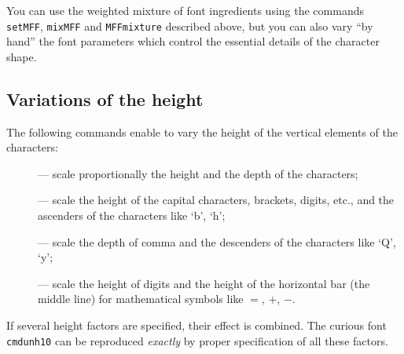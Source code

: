 You can use the weighted mixture of font ingredients using the commands
{\tt\bs{}setMFF}, {\tt\bs{}mixMFF} and {\tt\bs{}MFFmixture} described
above, but you can also vary ``by hand'' the font parameters
which control the essential details of the character shape.

\subsection{Variations of the height\label{HEIGHT}}

The following commands enable to vary the height of the vertical
elements of the characters:
\begin{description}
\item[] --- scale proportionally
     the height and the depth of the characters;
\item[] --- scale
     the height of the capital characters, brackets, digits, etc.,
     and the ascenders of the characters like `b', `h';
\item[] --- scale
     the depth of comma and the descenders of the characters
     like `Q', `y';
\item[] --- scale
     the height of digits and the height of
     the horizontal bar (the middle line) for mathematical symbols
     like $=$, $+$, $-$.
\end{description}
If several height factors are specified, their effect is combined.
The curious font {\tt cmdunh10} can be reproduced {\em exactly}
by proper specification of all these factors.


